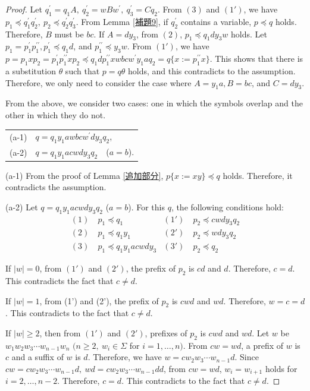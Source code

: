 \begin{proof}
Let $q^{\prime}_{1}=q_{1}A,~q^{\prime}_{2}=wBw^{\prime},~q^{\prime}_{3}=Cq_{2}$. From $(3)$ and $(1')$, we have $p_{1} \preceq q^{\prime}_{1}q^{\prime}_{2},~p_{2} \preceq q^{\prime}_{2}q^{\prime}_{3}$.
From Lemma \ref{補題9}, if $q^{\prime}_{2}$ contains a variable, $p \preceq q$ holds.
Therefore, $B$ must be $bc$.
If $A=dy_{3}$, from $(2)$, $p_{1} \preceq q_{1}dy_{3}w$ holds.
Let $p_{1}=p^{\prime}_{1}p^{\prime\prime}_{1}, p^{\prime}_{1} \preceq q_{1}d$, and $p^{\prime\prime}_{1} \preceq y_{3}w$.
From $(1')$, we have $p=p_{1}xp_{2}=p^{\prime}_{1}p^{\prime\prime}_{1}xp_{2} \preceq q_{1}dp^{\prime\prime}_{1}xwbcw^{\prime}y_{1}aq_{2}=q \{ x:=p^{\prime\prime}_{1}x \}$. This shows that there is a substitution $\theta$ such that $p=q\theta$ holds, and this contradicts to the assumption. Therefore, we only need to consider the case where $A=y_{1}a,B=bc$, and $C=dy_{3}$.

From the above, we consider two cases: one in which the symbols overlap and the other in which they do not.
\smallskip

\begin{tabular}{cl}
\textrm{(a-1)} & $q=q_{1}y_{1}awbcw^{\prime}dy_{3}q_{2}$,\\
\textrm{(a-2)} & $q=q_{1}y_{1}acwdy_{3}q_{2}$~~($a=b$).
\end{tabular}
\smallskip

\textrm{(a-1)}
From the proof of Lemma \ref{追加部分}, $p \{ x:= xy \} \preceq q$ holds.
Therefore, it contradicts the assumption.

\textrm{(a-2)}
Let $q=q_{1}y_{1}acwdy_{3}q_{2}$ ($a=b$).
For this $q$, the following conditions hold:
\begin{align*}
(1)~& p_{1} \preceq q_{1} & (1')~& p_{2} \preceq cwdy_{3}q_{2} \\
(2)~& p_{1} \preceq q_{1}y_{1} & (2')~& p_{2} \preceq wdy_{3}q_{2} \\
(3)~& p_{1} \preceq q_{1}y_{1}acwdy_{3} & (3')~& p_{2} \preceq q_{2}
\end{align*}

%
If $|w|=0$, from $(1')$ and $(2')$, the prefix of $p_{2}$ is $cd$ and $d$.
Therefore, $c=d$. This contradicts the fact that $c \not = d$.

If $|w|=1$, from (1') and (2'), the prefix of $p_{2}$ is $cwd$ and $wd$.
Therefore, $w=c=d$.
This contradicts to the fact that $c \not = d$.

If $|w| \ge 2$, then from $(1')$ and $(2')$,  prefixes of $p_{2}$ is $cwd$ and $wd$.
Let $w$ be $w_{1}w_{2}w_{3} \cdots w_{n-1}w_{n}$ $(n\geq 2,~w_{i}\in\Sigma$ for $i=1, \ldots , n)$.
From $cw=wd$, a prefix of $w$ is $c$ and a suffix of $w$ is $d$.
Therefore, we have $w=cw_{2}w_{3} \cdots w_{n-1}d$.
Since $cw=cw_{2}w_{3} \cdots w_{n-1}d,~wd=cw_{2}w_{3} \cdots w_{n-1}dd$, from $cw=wd$, $w_{i}=w_{i+1}$ holds for $i=2, \ldots , n-2$.
Therefore, $c=d$. This contradicts to the fact that $c \not = d$.


\end{proof}
